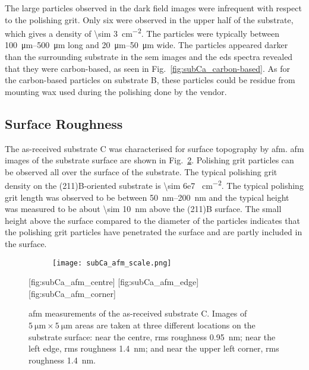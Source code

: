 The large particles observed in the dark field images were infrequent with respect to the polishing grit. Only six were observed in the upper half of the substrate, which gives a density of \SI{\sim 3}{\centi\metre^{-2}}. The particles were typically between \SIrange{100}{500}{\micro\metre} long and \SIrange{20}{50}{\micro\metre} wide. The particles appeared darker than the surrounding substrate in the \ac{sem} images and the \ac{eds} spectra revealed that they were carbon-based, as seen in Fig.~\ref{fig:subCa_carbon-based}. As for the carbon-based particles on substrate B, these particles could be residue from mounting wax used during the polishing done by the vendor.

\subsection{Surface Roughness}
The as-received substrate C was characterised for surface topography by \ac{afm}. \Ac{afm} images of the substrate surface are shown in Fig.~\ref{fig:subCa_afm}. Polishing grit particles can be observed all over the surface of the substrate. The typical polishing grit density on the (211)B-oriented substrate is \SI{\sim 6e7 }{\centi\metre^{-2}}. The typical polishing grit length was observed to be between \SIrange{50}{200}{\nano\metre} and the typical height was measured to be about \SI{\sim 10}{\nano\metre} above the (211)B surface. The small height above the surface compared to the diameter of the particles indicates that the polishing grit particles have penetrated the surface and are partly included in the surface.

\begin{figure}[htbp]
    \centering
    \begin{subfigure}[c]{0.032\linewidth}
        \label{fig:subCa_afm_scale}\captionsetup{list=no}
        \texttt{[image: subCa\_afm\_scale.png]}
    \end{subfigure}
    \hfill
    [fig:subCa_afm_centre]%
    \hfill
    [fig:subCa_afm_edge]%
    \hfill
    [fig:subCa_afm_corner]%
    \caption[\Ac{afm} of as-received substrate C.]{\Ac{afm} measurements of the as-received substrate C. Images of $\SI{5}{\micro\metre}\times\SI{5}{\micro\metre}$ areas are taken at three different locations on the substrate surface:  near the centre, \ac{rms} roughness \SI{0.95}{\nano\metre};  near the left edge, \ac{rms} roughness \SI{1.4}{\nano\metre}; and  near the upper left corner, \ac{rms} roughness \SI{1.4}{\nano\metre}.}
    \label{fig:subCa_afm}
\end{figure} %

